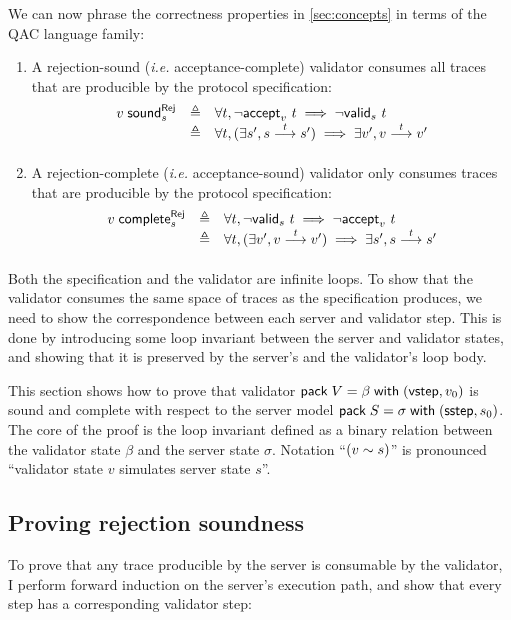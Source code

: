 We can now phrase the correctness properties in \autoref{sec:concepts} in terms
of the QAC language family:
\begin{enumerate}
  \item A rejection-sound ({\it i.e.} acceptance-complete) validator consumes
    all traces that are producible by the protocol specification:
    \[\begin{array}{lrl}
      \rejSound v s&\triangleq&\forall t,\rejects v t\implies\invalid s t\\
      &\triangleq&\forall t,(\exists s',\behaves s t s')\implies\exists v',\behaves v t v'
    \end{array}\]
  \item A rejection-complete ({\it i.e.} acceptance-sound) validator only
    consumes traces that are producible by the protocol specification:
    \[\begin{array}{lrl}
      \rejComplete v s&\triangleq&\forall t,\invalid s t\implies\rejects v t\\
      &\triangleq&\forall t,(\exists v',\behaves v t v')\implies\exists s',\behaves s t s'
    \end{array}\]
\end{enumerate}

Both the specification and the validator are infinite loops.  To show that the
validator consumes the same space of traces as the specification produces, we
need to show the correspondence between each server and validator step.  This is
done by introducing some loop invariant between the server and validator states,
and showing that it is preserved by the server's and the validator's loop body.

This section shows how to prove that validator $\mathsf{pack}\;V=\beta\;\mathsf{with}\;(\mathsf{vstep},v_0)$
is sound and complete with respect to the server model
$\mathsf{pack}\;S=\sigma\;\mathsf{with}\;(\mathsf{sstep},s_0)$.  The core of the proof is the loop invariant
defined as a binary relation between the validator state $\beta$ and the server
state $\sigma$.  Notation ``$(v\sim s)$'' is pronounced ``validator state
$v$ simulates server state $s$''.

\subsection{Proving rejection soundness}
\label{sec:qac-soundness}
To prove that any trace producible by the server is consumable by the validator,
I perform forward induction on the server's execution path, and show that every
step has a corresponding validator step:

